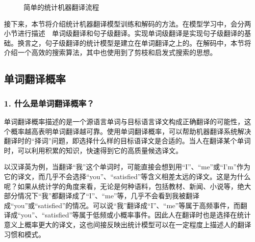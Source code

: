 \begin{figure}[htp]
    \centering

    \caption{简单的统计机器翻译流程}
    \label{fig:5-5}
\end{figure}
\vspace{-0.5em}

\parinterval 接下来，本节将介绍统计机器翻译模型训练和解码的方法。在模型学习中，会分两小节进行描述\ \dash \ 单词级翻译和句子级翻译。实现单词级翻译是实现句子级翻译的基础。换言之，句子级翻译的统计模型是建立在单词翻译之上的。在解码中，本节将介绍一个高效的搜索算法，其中也使用到了剪枝和启发式搜索的思想。


\subsection{单词翻译概率}\label{chapter5.2.3}


\subsubsection{1. 什么是单词翻译概率？}

\parinterval 单词翻译概率描述的是一个源语言单词与目标语言译文构成正确翻译的可能性，这个概率越高表明单词翻译越可靠。使用单词翻译概率，可以帮助机器翻译系统解决翻译时的“择词”问题，即选择什么样的目标语译文是合适的。当人在翻译某个单词时，可以利用积累的知识，快速得到它的高质量候选译文。

\parinterval 以汉译英为例，当翻译“我”这个单词时，可能直接会想到用“I”、“me”或“I'm”作为它的译文，而几乎不会选择“you”、“satisfied”等含义相差太远的译文。这是为什么呢？如果从统计学的角度来看，无论是何种语料，包括教材、新闻、小说等，绝大部分情况下“我”都翻译成了“I”、“me”等，几乎不会看到我被翻译成“you”或“satisfied”的情况。可以说“我”翻译成“I”、“me”等属于高频事件，而翻译成“you”、“satisfied”等属于低频或小概率事件。因此人在翻译时也是选择在统计意义上概率更大的译文，这也间接反映出统计模型可以在一定程度上描述人的翻译习惯和模式。

